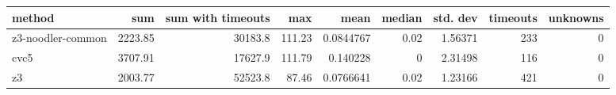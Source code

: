 \begin{tabular}{lrrrrrrrr}
\hline
 method            &     sum &   sum with timeouts &    max &      mean &   median &   std. dev &   timeouts &   unknowns \\
\hline
 z3-noodler-common & 2223.85 &             30183.8 & 111.23 & 0.0844767 &     0.02 &    1.56371 &        233 &          0 \\
 cvc5              & 3707.91 &             17627.9 & 111.79 & 0.140228  &     0    &    2.31498 &        116 &          0 \\
 z3                & 2003.77 &             52523.8 &  87.46 & 0.0766641 &     0.02 &    1.23166 &        421 &          0 \\
\hline
\end{tabular}
